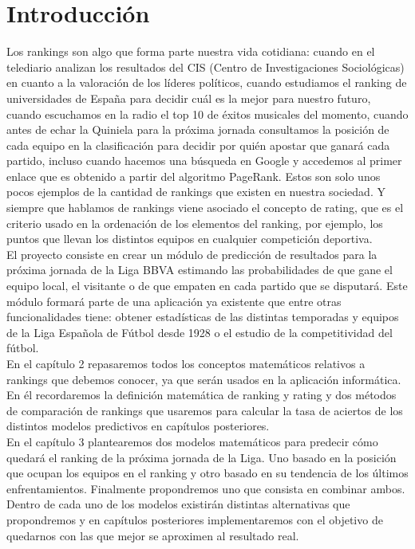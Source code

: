 \chapter{Introducción}
Los rankings son algo que forma parte nuestra vida cotidiana: cuando en el telediario analizan los resultados del CIS (Centro de Investigaciones Sociológicas) en cuanto a la valoración de los líderes políticos, cuando estudiamos el ranking de universidades de España para decidir cuál es la mejor para nuestro futuro, cuando escuchamos en la radio el top 10 de éxitos musicales del momento, cuando antes de echar la Quiniela para la próxima jornada consultamos la posición de cada equipo en la clasificación para decidir por quién apostar que ganará cada partido, incluso cuando hacemos una búsqueda en Google y accedemos al primer enlace que es obtenido a partir del algoritmo PageRank. Estos son solo unos pocos ejemplos de la cantidad de rankings que existen en nuestra sociedad. Y siempre que hablamos de rankings viene asociado el concepto de rating, que es el criterio usado en la ordenación de los elementos del ranking, por ejemplo, los puntos que llevan los distintos equipos en cualquier competición deportiva.\\

El proyecto consiste en crear un módulo de predicción de resultados para la próxima jornada de la Liga BBVA estimando las probabilidades de que gane el equipo local, el visitante o de que empaten en cada partido que se disputará. Este módulo formará parte de una aplicación ya existente que entre otras funcionalidades tiene: obtener estadísticas de las distintas temporadas y equipos de la Liga Española de Fútbol desde 1928 o el estudio de la competitividad del fútbol.\\ 

En el capítulo 2 repasaremos todos los conceptos matemáticos relativos a rankings que debemos conocer, ya que serán usados en la aplicación informática.
En él recordaremos la definición matemática de ranking y rating y dos métodos de comparación de rankings que usaremos para calcular la tasa de aciertos de los distintos modelos predictivos en capítulos posteriores.\\ 

En el capítulo 3 plantearemos dos modelos matemáticos para predecir cómo quedará el ranking de la próxima jornada de la Liga. Uno basado en la posición que ocupan los equipos en el ranking y otro basado en su tendencia de los últimos enfrentamientos. Finalmente propondremos uno que consista en combinar ambos. Dentro de cada uno de los modelos existirán distintas alternativas que propondremos y en capítulos posteriores implementaremos con el objetivo de quedarnos con las que mejor se aproximen al resultado real. \\

